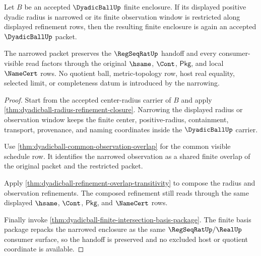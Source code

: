 \begin{theorem}
\label{thm:dyadicball-radius-window-monotonicity}
Let $B$ be an accepted $\DyadicBallUp$ finite enclosure. If its displayed
positive dyadic radius is narrowed or its finite observation window is
restricted along displayed refinement rows, then the resulting finite
enclosure is again an accepted $\DyadicBallUp$ packet.

The narrowed packet preserves the $\RegSeqRatUp$ handoff and every
consumer-visible read factors through the original $\hsame$, $\Cont$,
$\mathsf{Pkg}$, and local $\NameCert$ rows. No quotient ball, metric-topology
row, host real equality, selected limit, or completeness datum is introduced
by the narrowing.
\end{theorem}
\begin{proof}
Start from the accepted center-radius carrier of $B$ and apply
\autoref{thm:dyadicball-radius-refinement-closure}. Narrowing the displayed
radius or observation window keeps the finite center, positive-radius,
containment, transport, provenance, and naming coordinates inside the
$\DyadicBallUp$ carrier.

Use \autoref{thm:dyadicball-common-observation-overlap} for the common visible
schedule row. It identifies the narrowed observation as a shared finite
overlap of the original packet and the restricted packet.

Apply \autoref{thm:dyadicball-refinement-overlap-transitivity} to compose the
radius and observation refinements. The composed refinement still reads
through the same displayed $\hsame$, $\Cont$, $\mathsf{Pkg}$, and
$\NameCert$ rows.

Finally invoke \autoref{thm:dyadicball-finite-intersection-basis-package}. The
finite basis package repacks the narrowed enclosure as the same
$\RegSeqRatUp/\RealUp$ consumer surface, so the handoff is preserved and no
excluded host or quotient coordinate is available.
\end{proof}

